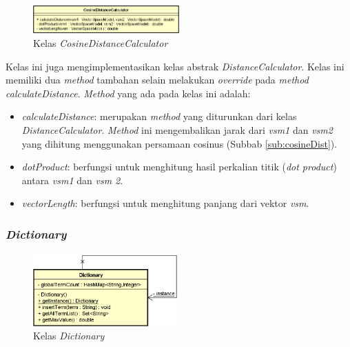\documentclass[a4paper,twoside]{article}
\begin{document}
\begin{enumerate}
\begin{figure}[h]
	\begin{center}
		\includegraphics[width=0.5\textwidth]{DiagramKelas/CosineDistanceCalculator}
		\caption{Kelas \textit{CosineDistanceCalculator}}
		\label{fig:kelasCosineDist}
	\end{center}
\end{figure}

Kelas ini juga mengimplementasikan kelas abstrak \textit{DistanceCalculator}. Kelas ini memiliki dua \textit{method} tambahan selain melakukan \textit{override} pada \textit{method calculateDistance}. \textit{Method} yang ada pada kelas ini adalah:

\begin{itemize}
	\item \textit{calculateDistance}: merupakan \textit{method} yang diturunkan dari kelas \textit{DistanceCalculator}. \textit{Method} ini mengembalikan jarak dari \textit{vsm1} dan \textit{vsm2} yang dihitung menggunakan persamaan cosinus (Subbab \ref{sub:cosineDist}).
	\item \textit{dotProduct}: berfungsi untuk menghitung hasil perkalian titik (\textit{dot product}) antara \textit{vsm1} dan \textit{vsm 2}.
	\item \textit{vectorLength}: berfungsi untuk menghitung panjang dari vektor \textit{vsm}.
\end{itemize}

\subsubsection*{\textit{Dictionary}}

\begin{figure}[h]
	\begin{center}
		\includegraphics[width=0.5\textwidth]{DiagramKelas/Dictionary}
		\caption{Kelas \textit{Dictionary}}
		\label{fig:kelasDictionary}
	\end{center}
\end{figure}


\end{enumerate}
\end{document}
